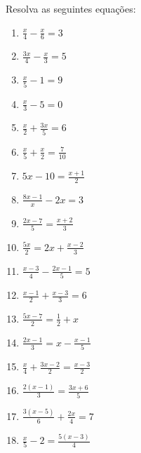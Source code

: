 				\item Resolva as seguintes equações:
					\begin{multicols}{3}
					\begin{enumerate}
						\item $\displaystyle\frac{x}{4}-\frac{x}{6}=3$
						\item $\displaystyle\frac{3x}{4}-\frac{x}{3}=5$
						\item $\displaystyle\frac{x}{5}-1=9$
						\item $\displaystyle\frac{x}{3}-5=0$
						\item $\displaystyle\frac{x}{2}+\frac{3x}{5}=6$
						\item $\displaystyle\frac{x}{5}+\frac{x}{2}=\frac{7}{10}$
						\item $5x-10=\displaystyle\frac{x+1}{2}$
						\item $\displaystyle\frac{8x-1}{x}-2x=3$
						\item $\displaystyle\frac{2x-7}{5}=\frac{x+2}{3}$
						\item $\displaystyle\frac{5x}{2}=2x+\frac{x-2}{3}$
						\item $\displaystyle\frac{x-3}{4}-\frac{2x-1}{5}=5$
						\item $\displaystyle\frac{x-1}{2}+\frac{x-3}{3}=6$
						\item $\displaystyle\frac{5x-7}{2}=\frac{1}{2}+x$
						\item $\displaystyle\frac{2x-1}{3}=x-\frac{x-1}{5}$
						\item $\displaystyle\frac{x}{4}+\frac{3x-2}{2}=\frac{x-3}{2}$
						\item $\displaystyle\frac{2(x-1)}{3}=\frac{3x+6}{5}$
						\item $\displaystyle\frac{3(x-5)}{6}+\frac{2x}{4}=7$
						\item $\displaystyle\frac{x}{5}-2=\frac{5(x-3)}{4}$
					\end{enumerate}
					\end{multicols}					
				
